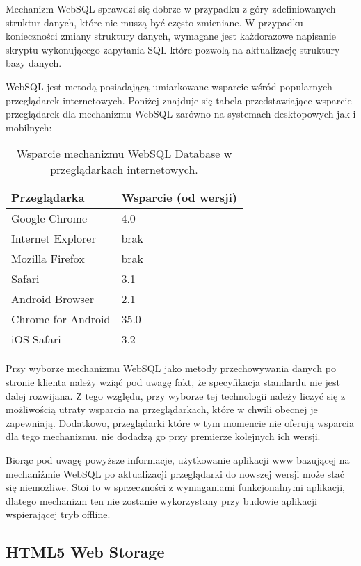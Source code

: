 Mechanizm WebSQL sprawdzi się dobrze w przypadku z góry zdefiniowanych struktur danych, które nie muszą być często zmieniane. W przypadku konieczności zmiany struktury danych, wymagane jest każdorazowe napisanie skryptu wykonującego zapytania SQL które pozwolą na aktualizację struktury bazy danych.

WebSQL jest metodą posiadającą umiarkowane wsparcie wśród popularnych przeglądarek internetowych. Poniżej znajduje się tabela przedstawiające wsparcie przeglądarek dla mechanizmu WebSQL zarówno na systemach desktopowych jak i mobilnych:

\begin{table}[h]
\centering
    \begin{tabular}{ | p{8cm} | p{6cm} | }
    \hline
    \textbf{Przeglądarka} & \textbf{Wsparcie (od wersji)} \\ \hline
	Google Chrome & 4.0
	\\ \hline
	Internet Explorer & brak
	\\ \hline
	Mozilla Firefox & brak
	\\ \hline
	Safari & 3.1
	\\ \hline
	Android Browser & 2.1
	\\ \hline
	Chrome for Android & 35.0
	\\ \hline
	iOS Safari & 3.2
	\\ \hline
    \end{tabular}
	\caption{Wsparcie mechanizmu WebSQL Database w przeglądarkach internetowych.}
\end{table}

Przy wyborze mechanizmu WebSQL jako metody przechowywania danych po stronie klienta należy wziąć pod uwagę fakt, że specyfikacja standardu nie jest dalej rozwijana. Z tego względu, przy wyborze tej technologii należy liczyć się z możliwością utraty wsparcia na przeglądarkach, które w chwili obecnej je zapewniają. Dodatkowo, przeglądarki które w tym momencie nie oferują wsparcia dla tego mechanizmu, nie dodadzą go przy premierze kolejnych ich wersji.

Biorąc pod uwagę powyższe informacje, użytkowanie aplikacji www bazującej na mechaniźmie WebSQL po aktualizacji przeglądarki do nowszej wersji może stać się niemożliwe. Stoi to w sprzeczności z wymaganiami funkcjonalnymi aplikacji, dlatego mechanizm ten nie zostanie wykorzystany przy budowie aplikacji wspierającej tryb offline.

\subsection{HTML5 Web Storage}
\label{sec:html5WebStorage}

